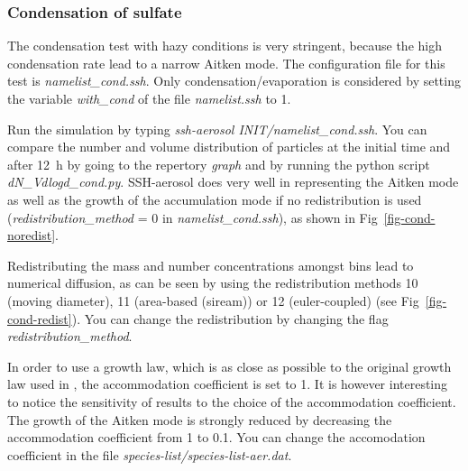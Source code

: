 \documentclass[a4paper,11pt]{article}
\begin{document}
\subsubsection{Condensation of sulfate}
\label{cond-sulf}

The condensation test with hazy conditions is very stringent, because the high condensation
rate lead to a narrow Aitken mode.
The configuration file for this test is {\it{namelist\_cond.ssh}}.
Only condensation/evaporation is considered by setting the variable {\it{with\_cond}} of the file {\it{namelist.ssh}} to 1.

Run the simulation by typing {\it{ssh-aerosol INIT/namelist\_cond.ssh}}.
You can compare the number and volume distribution of particles at the initial
time and after 12~h by going to the repertory {\it{graph}} and by running the
python script {\it{dN\_Vdlogd\_cond.py}}.
SSH-aerosol does very well in representing
the Aitken mode as well as the growth of the accumulation mode if no
redistribution is used ({\it{redistribution\_method}} = 0 in
{\it{namelist\_cond.ssh}}), as shown in Fig~\ref{fig-cond-noredist}. 

Redistributing the mass and number concentrations
amongst bins lead to numerical diffusion, as can be seen by using the
redistribution methods 10 (moving diameter), 11 (area-based (siream)) or 12
(euler-coupled) (see Fig~\ref{fig-cond-redist}).
You can change the redistribution by changing the flag {\it{redistribution\_method}}.

In order to use a growth law, which is as close as possible to the original growth law
used in \cite{zhang1999simulation} , the accommodation coefficient is set to 1. It is however interesting
to notice the sensitivity of results to the choice of the accommodation coefficient. 
The growth of the Aitken mode is strongly reduced by decreasing the
accommodation coefficient from 1 to 0.1.
You can change the accomodation coefficient in the file {\it{species-list/species-list-aer.dat}}.
\end{document}

